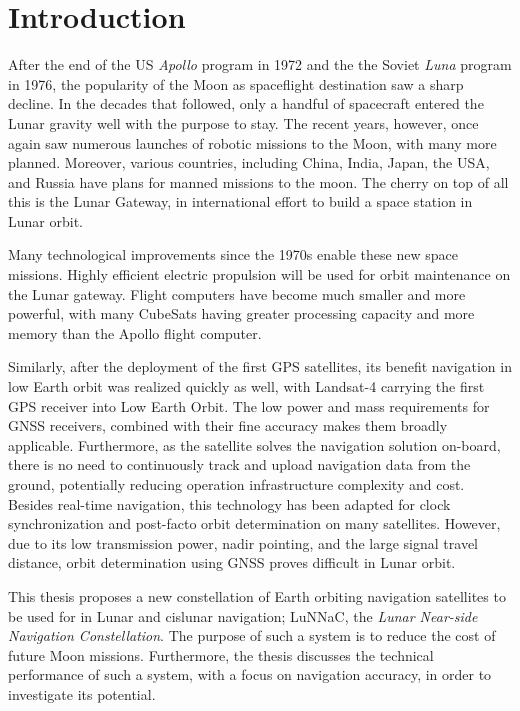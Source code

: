 
\chapter{Introduction}
\label{ch:intro}

After the end of the US \textit{Apollo} program in 1972 and the  the Soviet \textit{Luna} program in 1976, the popularity of the Moon as spaceflight destination saw a sharp decline. 
In the decades that followed, only a handful of spacecraft entered the Lunar gravity well with the purpose to stay. 
The recent years, however, once again saw numerous launches of robotic missions to the Moon, with many more planned.
Moreover, various countries, including China, India, Japan, the USA, and Russia have plans for manned missions to the moon. 
The cherry on top of all this is the Lunar Gateway, in international effort to build a space station in Lunar orbit.

Many technological improvements since the 1970s enable these new space missions. 
Highly efficient electric propulsion will be used for orbit maintenance on the Lunar gateway. 
Flight computers have become much smaller and more powerful, with many CubeSats having greater processing capacity and more memory than the Apollo flight computer. 

Similarly, after the deployment of the first GPS satellites, its benefit navigation in low Earth orbit was realized quickly as well, with Landsat-4 carrying the first GPS receiver into Low Earth Orbit. 
The low power and mass requirements for GNSS receivers, combined with their fine accuracy makes them broadly applicable.
Furthermore, as the satellite solves the navigation solution on-board, there is no need to continuously track and upload navigation data from the ground, potentially reducing operation infrastructure complexity and cost.
Besides real-time navigation, this technology has been adapted for clock synchronization and post-facto orbit determination on many satellites.
However, due to its low transmission power, nadir pointing, and the large signal travel distance, orbit determination using GNSS proves difficult in Lunar orbit.


This thesis proposes a new constellation of Earth orbiting navigation satellites to be used for in Lunar and cislunar navigation; LuNNaC, the \textit{Lunar Near-side Navigation Constellation}.
The purpose of such a system is to reduce the cost of future Moon missions.
Furthermore, the thesis discusses the technical performance of such a system, with a focus on navigation accuracy, in order to investigate its potential.


